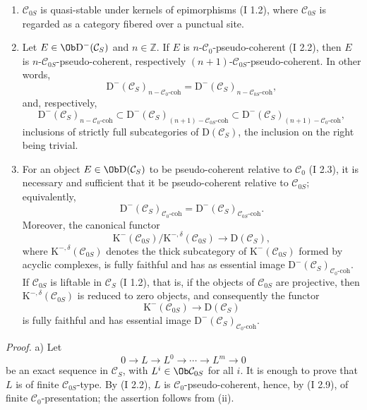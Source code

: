 \begin{enumerate}[label=\alph*)]
\item $\mathcal C_{0S}$ is quasi-stable under kernels of epimorphisms (I 1.2), where $\mathcal C_{0S}$ is regarded as a category fibered over a punctual site.
\item Let $E\in\Ob \mathrm D^{-}(\mathcal C_S)$ and $n\in\mathbb Z$. If $E$ is $n$-$\mathcal C_0$-pseudo-coherent (I 2.2), then $E$ is $n$-$\mathcal C_{0S}$-pseudo-coherent, respectively $(n+1)$-$\mathcal C_{0S}$-pseudo-coherent. In other words,
\[
\mathrm D^{-}(\mathcal C_S)_{n-\mathcal C_0\text{-coh}}
=
\mathrm D^{-}(\mathcal C_S)_{n-\mathcal C_{0S}\text{-coh}},
\]
and, respectively,
\[
\mathrm D^{-}(\mathcal C_S)_{n-\mathcal C_0\text{-coh}}
\subset
\mathrm D^{-}(\mathcal C_S)_{(n+1)-\mathcal C_{0S}\text{-coh}}
\subset
\mathrm D^{-}(\mathcal C_S)_{(n+1)-\mathcal C_0\text{-coh}},
\]
inclusions of strictly full subcategories of $\mathrm D(\mathcal C_S)$, the inclusion on the right being trivial.
\item For an object $E\in\Ob\mathrm D(\mathcal C_S)$ to be pseudo-coherent relative to $\mathcal C_0$ (I 2.3), it is necessary and sufficient that it be pseudo-coherent relative to $\mathcal C_{0S}$; equivalently,
\[
\mathrm D^{-}(\mathcal C_S)_{\mathcal C_0\text{-coh}}
=
\mathrm D^{-}(\mathcal C_S)_{\mathcal C_{0S}\text{-coh}}.
\]
Moreover, the canonical functor
\[
\mathrm K^{-}(\mathcal C_{0S})/\mathrm K^{-,\delta}(\mathcal C_{0S})
\longrightarrow \mathrm D(\mathcal C_S),
\]
where $\mathrm K^{-,\delta}(\mathcal C_{0S})$ denotes the thick subcategory of $\mathrm K^{-}(\mathcal C_{0S})$ formed by acyclic complexes, is fully faithful and has as essential image $\mathrm D^{-}(\mathcal C_S)_{\mathcal C_0\text{-coh}}$. If $\mathcal C_{0S}$ is liftable in $\mathcal C_S$ (I 1.2), that is, if the objects of $\mathcal C_{0S}$ are projective, then $\mathrm K^{-,\delta}(\mathcal C_{0S})$ is reduced to zero objects, and consequently the functor
\[
\mathrm K^{-}(\mathcal C_{0S})\longrightarrow \mathrm D(\mathcal C_S)
\]
is fully faithful and has essential image $\mathrm D^{-}(\mathcal C_S)_{\mathcal C_0\text{-coh}}$.
\end{enumerate}

\emph{Proof.} a) Let
\[
0\longrightarrow L\longrightarrow L^0\longrightarrow\cdots\longrightarrow L^m\longrightarrow0
\]
be an exact sequence in $\mathcal C_S$, with $L^i\in\Ob\mathcal C_{0S}$ for all $i$. It is enough to prove that $L$ is of finite $\mathcal C_{0S}$-type. By (I 2.2), $L$ is $\mathcal C_0$-pseudo-coherent, hence, by (I 2.9), of finite $\mathcal C_0$-presentation; the assertion follows from (ii).


